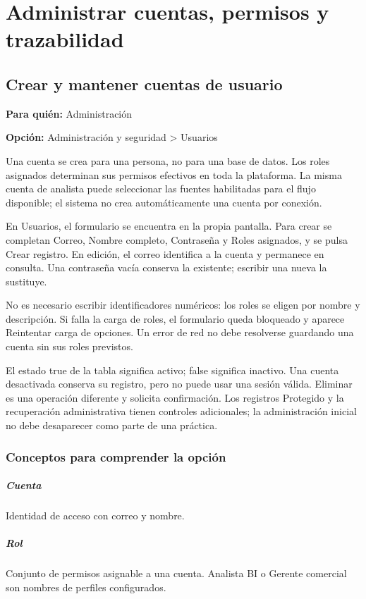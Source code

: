 \chapter{Administrar cuentas, permisos y trazabilidad}
\section{Crear y mantener cuentas de usuario}
\label{unidad:operacion_04}
\textbf{Para quién:} Administración\par
\textbf{Opción:} Administración y seguridad > Usuarios\par

Una cuenta se crea para una persona, no para una base de datos. Los roles asignados determinan sus permisos efectivos en toda la plataforma. La misma cuenta de analista puede seleccionar las fuentes habilitadas para el flujo disponible; el sistema no crea automáticamente una cuenta por conexión.

En Usuarios, el formulario se encuentra en la propia pantalla. Para crear se completan Correo, Nombre completo, Contraseña y Roles asignados, y se pulsa Crear registro. En edición, el correo identifica a la cuenta y permanece en consulta. Una contraseña vacía conserva la existente; escribir una nueva la sustituye.

No es necesario escribir identificadores numéricos: los roles se eligen por nombre y descripción. Si falla la carga de roles, el formulario queda bloqueado y aparece Reintentar carga de opciones. Un error de red no debe resolverse guardando una cuenta sin sus roles previstos.

El estado true de la tabla significa activo; false significa inactivo. Una cuenta desactivada conserva su registro, pero no puede usar una sesión válida. Eliminar es una operación diferente y solicita confirmación. Los registros Protegido y la recuperación administrativa tienen controles adicionales; la administración inicial no debe desaparecer como parte de una práctica.

\subsection{Conceptos para comprender la opción}
\paragraph{Cuenta} Identidad de acceso con correo y nombre.

\paragraph{Rol} Conjunto de permisos asignable a una cuenta. Analista BI o Gerente comercial son nombres de perfiles configurados.

